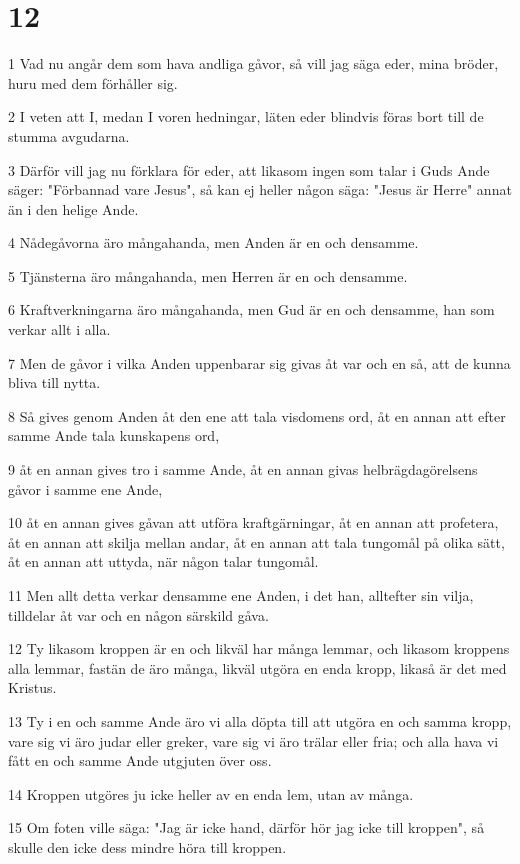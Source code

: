 \chapter{12}

\par 1 Vad nu angår dem som hava andliga gåvor, så vill jag säga eder, mina bröder, huru med dem förhåller sig.
\par 2 I veten att I, medan I voren hedningar, läten eder blindvis föras bort till de stumma avgudarna.
\par 3 Därför vill jag nu förklara för eder, att likasom ingen som talar i Guds Ande säger: "Förbannad vare Jesus", så kan ej heller någon säga: "Jesus är Herre" annat än i den helige Ande.
\par 4 Nådegåvorna äro mångahanda, men Anden är en och densamme.
\par 5 Tjänsterna äro mångahanda, men Herren är en och densamme.
\par 6 Kraftverkningarna äro mångahanda, men Gud är en och densamme, han som verkar allt i alla.
\par 7 Men de gåvor i vilka Anden uppenbarar sig givas åt var och en så, att de kunna bliva till nytta.
\par 8 Så gives genom Anden åt den ene att tala visdomens ord, åt en annan att efter samme Ande tala kunskapens ord,
\par 9 åt en annan gives tro i samme Ande, åt en annan givas helbrägdagörelsens gåvor i samme ene Ande,
\par 10 åt en annan gives gåvan att utföra kraftgärningar, åt en annan att profetera, åt en annan att skilja mellan andar, åt en annan att tala tungomål på olika sätt, åt en annan att uttyda, när någon talar tungomål.
\par 11 Men allt detta verkar densamme ene Anden, i det han, alltefter sin vilja, tilldelar åt var och en någon särskild gåva.
\par 12 Ty likasom kroppen är en och likväl har många lemmar, och likasom kroppens alla lemmar, fastän de äro många, likväl utgöra en enda kropp, likaså är det med Kristus.
\par 13 Ty i en och samme Ande äro vi alla döpta till att utgöra en och samma kropp, vare sig vi äro judar eller greker, vare sig vi äro trälar eller fria; och alla hava vi fått en och samme Ande utgjuten över oss.
\par 14 Kroppen utgöres ju icke heller av en enda lem, utan av många.
\par 15 Om foten ville säga: "Jag är icke hand, därför hör jag icke till kroppen", så skulle den icke dess mindre höra till kroppen.
